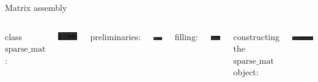 \documentclass[aspectratio=169,xcolor=dvipsnames]{beamer}
\begin{document}
\begin{frame}{Matrix assembly}

\begin{columns}[c]


class $\mathrm{sparse\_mat}$:

\begin{center}
    \includegraphics[width=0.9\linewidth]{class_sparsematrix.png}
    \end{center}


        
       preliminaries: \\
\begin{center}
    \includegraphics[width=0.4\linewidth]{sparse_construct.png}
    \end{center}

filling:
 
\begin{center}
    \includegraphics[width=0.5\linewidth]{sparse_fill.png}
    \end{center}

constructing the $\mathrm{sparse\_mat}$ object: \\
\begin{center}
    \includegraphics[width=0.9\linewidth]{sparse_create.png}
    \end{center}
    \end{columns}


\end{frame}
\end{document}
